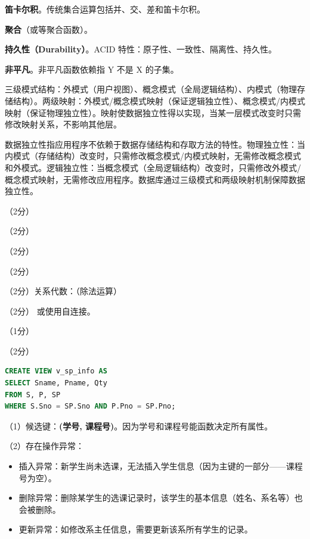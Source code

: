 \documentclass[a4paper,11pt]{article}
\begin{document}
\q \textbf{笛卡尔积}。传统集合运算包括并、交、差和笛卡尔积。

\q \textbf{聚合}（或等聚合函数）。

\q \textbf{持久性（Durability）}。ACID 特性：原子性、一致性、隔离性、持久性。

\q \textbf{非平凡}。非平凡函数依赖指 Y 不是 X 的子集。


\q 三级模式结构：外模式（用户视图）、概念模式（全局逻辑结构）、内模式（物理存储结构）。两级映射：外模式/概念模式映射（保证逻辑独立性）、概念模式/内模式映射（保证物理独立性）。映射使数据独立性得以实现，当某一层模式改变时只需修改映射关系，不影响其他层。

\q 数据独立性指应用程序不依赖于数据存储结构和存取方法的特性。物理独立性：当内模式（存储结构）改变时，只需修改概念模式/内模式映射，无需修改概念模式和外模式。逻辑独立性：当概念模式（全局逻辑结构）改变时，只需修改外模式/概念模式映射，无需修改应用程序。数据库通过三级模式和两级映射机制保障数据独立性。


\q （2分）

\q （2分）

\q （2分）

\q （2分）

\q （2分）关系代数：（除法运算）

\q （2分） 或使用自连接。

\q （1分）

\q （2分）
\begin{lstlisting}[language=SQL]
CREATE VIEW v_sp_info AS
SELECT Sname, Pname, Qty
FROM S, P, SP
WHERE S.Sno = SP.Sno AND P.Pno = SP.Pno;
\end{lstlisting}


\q （1）候选键：\textbf{(学号, 课程号)}。因为学号和课程号能函数决定所有属性。

\par（2）存在操作异常：
\begin{itemize}
  \item 插入异常：新学生尚未选课，无法插入学生信息（因为主键的一部分——课程号为空）。
  \item 删除异常：删除某学生的选课记录时，该学生的基本信息（姓名、系名等）也会被删除。
  \item 更新异常：如修改系主任信息，需要更新该系所有学生的记录。
\end{itemize}
\end{document}
